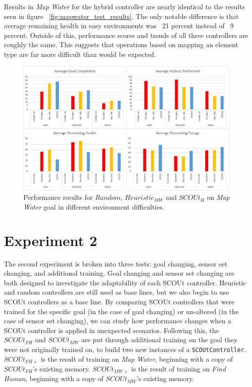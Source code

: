 Results in \textit{Map Water} for the hybrid controller are nearly identical to the results seen in figure ~\ref{fig:mapwater_test_results}.
The only notable difference is that average remaining health in easy environments was ~21 percent instead of ~9 percent.
Outside of this, performance scores and trends of all three controllers are roughly the same.
This suggests that operations based on mapping an element type are far more difficult than would be expected.

\begin{figure}[h]
  \includegraphics[width=1.0\columnwidth]{Figures/Results/Experiment1/HybridMapWater.JPG}
  \caption{Performance results for $Random$, $Heuristic_{MW}$ and $SCOUt_{H}$ on \textit{Map Water} goal in different environment difficulties.}
  \label{fig:hybrid_mapwater_test_results}
\end{figure}


\section{Experiment 2} \label{sec:experiment2}
The second experiment is broken into three tests: goal changing, sensor set changing, and additional training.
Goal changing and sensor set changing are both designed to investigate the adaptability of each SCOUt controller.
Heuristic and random controllers are still used as base lines, but we also begin to use SCOUt controllers as a base line.
By comparing SCOUt controllers that were trained for the specific goal (in the case of goal changing) or un-altered (in the case of sensor set changing), we can study how performance changes when a SCOUt controller is applied in unexpected scenarios.
Following this, the $SCOUt_{FH}$ and $SCOUt_{MW}$ are put through additional training on the goal they were not originally trained on, to build two new instances of a \texttt{SCOUtController}.
$SCOUt_{FH+}$ is the result of training on \textit{Map Water}, beginning with a copy of $SCOUt_{FH}$'s existing memory.
$SCOUt_{MW+}$ is the result of training on \textit{Find Human}, beginning with a copy of $SCOUt_{MW}$'s existing memory.

